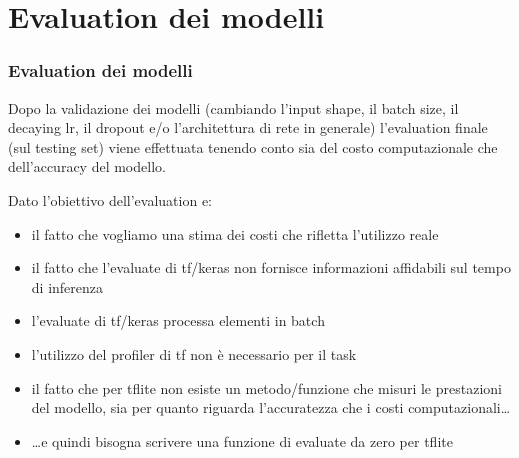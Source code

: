 \documentclass{beamer}
\newcommand{\dflvspace}{\vspace{10pt}}
\begin{document}
\section{Evaluation dei modelli}
\begin{frame}
    \frametitle{Evaluation dei modelli}
    
    Dopo la validazione dei modelli (cambiando l'input shape, il batch size, 
    il decaying lr, il dropout e/o l'architettura di rete in generale) l'evaluation finale
    (sul testing set) viene effettuata tenendo conto sia del costo computazionale che 
    dell'accuracy del modello.
    
    \dflvspace
    
    Dato l'obiettivo dell'evaluation e:
    \begin{itemize}
    		\item il fatto che vogliamo una stima dei costi che rifletta l'utilizzo reale
    		\item il fatto che l'evaluate di tf/keras non fornisce informazioni affidabili sul tempo di inferenza
    		\item l'evaluate di tf/keras processa elementi in batch
    		\item l'utilizzo del profiler di tf non è necessario per il task
    		\item il fatto che per tflite non esiste un metodo/funzione che misuri le prestazioni del modello,
    		sia per quanto riguarda l'accuratezza che i costi computazionali\dots
    		\item \dots e quindi bisogna scrivere una funzione di evaluate da zero per tflite
	\end{itemize}
\end{frame}
\end{document}
